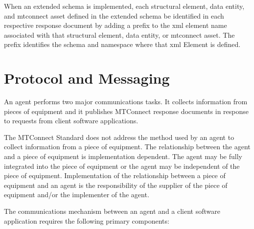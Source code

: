 When an extended \gls{schema} is implemented, each \gls{structural element}, \gls{data entity}, and \gls{mtconnect asset} defined in the extended \gls{schema} \MUST be identified in each respective \gls{response document} by adding a prefix to the \gls{xml} \gls{element name} associated with that \gls{structural element}, \gls{data entity}, or \gls{mtconnect asset}.  The prefix identifies the \gls{schema} and \gls{namespace} where that \gls{xml} Element is defined. 

\section{Protocol and Messaging}
\label{sec:Protocol and Messaging}

An \gls{agent} performs two \gls{major} communications tasks.  It collects information from pieces of equipment and it publishes MTConnect \glspl{response document} in response to \glspl{request} from client software applications.

The MTConnect Standard does not address the method used by an \gls{agent} to collect information from a piece of equipment.  The relationship between the \gls{agent} and a piece of equipment is implementation dependent.  The \gls{agent} may be fully integrated into the piece of equipment or the \gls{agent} may be independent of the piece of equipment.  Implementation of the relationship between a piece of equipment and an \gls{agent} is the responsibility of the supplier of the piece of equipment and/or the implementer of the \gls{agent}.

The communications mechanism between an \gls{agent} and a client software application requires the following primary components:

